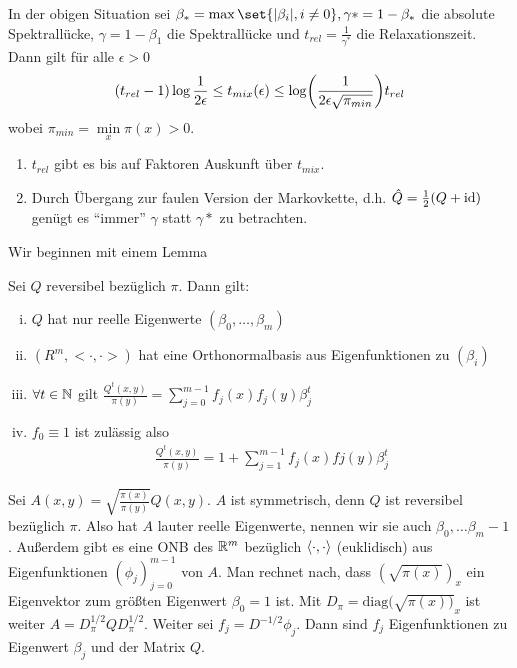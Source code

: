 \begin{satz}
	\label{satz:11-17}
	In der obigen Situation sei $\beta_* = \max\set{\abs{\beta_i},i\neq 0}, \gamma* = 1- \beta_*$ die absolute Spektrallücke, $\gamma = 1 - \beta_1$ die Spektrallücke und $t_{rel} = \frac{1}{\gamma^*}$ die Relaxationszeit. Dann gilt für alle $\epsilon > 0$ 
	\begin{align}
		(t_{rel} - 1) \log \frac{1}{2 \epsilon} \leq t_{mix} (\epsilon) \leq \log\enb{\frac{1}{2\epsilon \sqrt{\pi_{min}}}} t_{rel}
	\end{align}
	wobei $\pi_{min} = \min\limits_{x} \pi(x) > 0$.
\end{satz}
\begin{beweis}
	\begin{enumerate}
		\item $t_{rel}$ gibt es bis auf Faktoren Auskunft über $t_{mix}$.
		\item Durch Übergang zur faulen Version der Markovkette, d.h. $\hat{Q} = \frac{1}{2}(Q + \operatorname{id})$ genügt es \enquote{immer} $\gamma$ statt $\gamma*$ zu betrachten.
	\end{enumerate}
	Wir beginnen mit einem Lemma
	\begin{lemma}
		Sei $Q$ reversibel bezüglich $\pi$. Dann gilt:
		\begin{enumerate}[(i)]
			\item $Q$ hat nur reelle Eigenwerte $(\beta_0,\dots,\beta_m)$
			\item $(R^m,<\cdot,\cdot>)$ hat eine Orthonormalbasis aus Eigenfunktionen zu $(\beta_i)$
			\item $\forall t \in \mathbb{N}$ gilt $\frac{Q^t(x,y)}{\pi(y)}  = \sum\limits_{j = 0}^{m-1} f_j(x) f_j(y)\beta_j^t$
			\item $f_0 \equiv 1$ ist zulässig also \begin{align}
				\frac{Q^t(x,y)}{\pi(y)} = 1+ \sum\limits_{j = 1}^{m-1} f_j(x) fj(y) \beta^t_j
					\end{align}
		\end{enumerate}
	\end{lemma}
	\begin{beweis}
		Sei $A(x,y) = \sqrt{\frac{\pi(x)}{\pi(y)}} Q(x,y).$ $A$ ist symmetrisch, denn $Q$ ist reversibel bezüglich $\pi$. Also hat $A$ lauter reelle Eigenwerte, nennen wir sie auch $\beta_0, \dots \beta_m-1$. Außerdem gibt es eine ONB des $\mathbb{R}^m$ bezüglich $\langle\cdot,\cdot\rangle$ (euklidisch) aus Eigenfunktionen $(\phi_j)_{j=0}^{m-1}$ von $A$. Man rechnet nach, dass $(\sqrt{\pi(x)})_x$ ein Eigenvektor zum größten Eigenwert $\beta_0 = 1$ ist. Mit $D_\pi = \text{diag}(\sqrt{\pi(x))}_x$ ist weiter $A = D^{1/2}_{\pi}  Q D^{1/2}_{\pi}$. Weiter sei $f_j =  D^{-1/2} \phi_j$. Dann sind $f_j$ Eigenfunktionen zu Eigenwert $\beta_j$ und der Matrix $Q$. 

\end{beweis}
\end{beweis}
